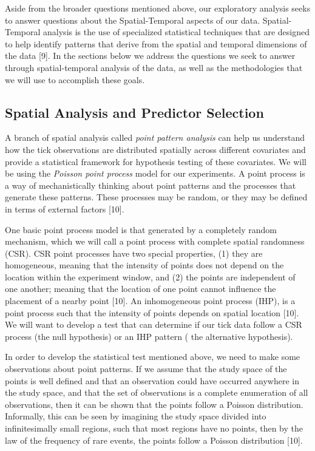 \noindent Aside from the broader questions mentioned above, our exploratory analysis seeks to answer questions about the Spatial-Temporal aspects of our data. Spatial-Temporal analysis is the use of specialized statistical techniques that are designed to help identify patterns that derive from the spatial and temporal dimensions of the data [9].  In the sections below we address the questions we seek to answer through spatial-temporal analysis of the data, as well as the methodologies that we will use to accomplish these goals. \newline

\subsection{Spatial Analysis and Predictor Selection}
\noindent A branch of spatial analysis called \textit{point pattern analysis} can help us understand how the tick observations are distributed spatially across different covariates and provide a statistical framework for hypothesis testing of these covariates. We will be using the \textit{Poisson point process} model for our experiments. A point process is a way of mechanistically thinking about point patterns and the processes that generate these patterns. These processes may be random, or they may be defined in terms of external factors [10]. \newline

\noindent One basic point process model is that generated by a completely random mechanism, which we will call a point process with complete spatial randomness (CSR). CSR point processes have two special properties, (1) they are homogeneous, meaning that the intensity of points does not depend on the location within the experiment window, and (2) the points are independent of one another; meaning that the location of one point cannot influence the placement of a nearby point [10]. An inhomogeneous point process (IHP), is a point process such that the intensity of points depends on spatial location [10]. We will want to develop a test that can determine if our tick data follow a CSR process (the null hypothesis) or an IHP pattern ( the alternative hypothesis). \newline 

\noindent In order to develop the statistical test mentioned above, we need to make some observations about point patterns. If we assume that the study space of the points is well defined and that an observation could have occurred anywhere in the study space, and that the set of observations is a complete enumeration of all observations, then it can be shown that the points follow a Poisson distribution. Informally, this can be seen by imagining the study space divided into infinitesimally small regions, such that most regions have no points, then by the law of the frequency of rare events, the points follow a Poisson distribution [10].  \newline

